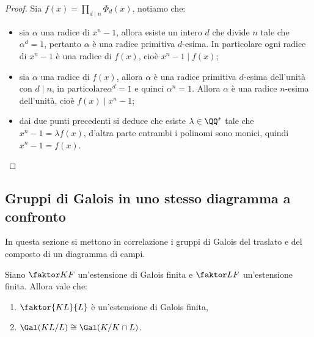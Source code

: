 \documentclass[11pt]{scrartcl}
\begin{document}
	\begin{proof}
		Sia $f(x) = \displaystyle\prod_{d \mid n}\Phi_d(x)$, notiamo che:
		\begin{itemize}
			\item sia $\alpha$ una radice di $x^n - 1$, allora esiste un intero $d$
			che divide $n$ tale che $\alpha^d = 1$, pertanto $\alpha$ è una radice primitiva
			$d$-esima. In particolare ogni radice di $x^n - 1$ è una radice di 
			$f(x)$, cioè $x^n - 1 \mid f(x)$;
			\item sia $\alpha$ una radice di $f(x)$, allora $\alpha$ è una radice
			primitiva $d$-esima dell'unità con $d\mid n$, in particolare$\alpha^d = 1$
			e quinci $\alpha^n = 1$. Allora $\alpha$ è una radice $n$-esima dell'unità,
			cioè $f(x) \mid x^n - 1$;
			\item dai due punti precedenti si deduce che esiste $\lambda \in \QQ^*$
			tale che $x^n - 1 = \lambda f(x)$, d'altra parte entrambi i polinomi
			sono monici, quindi $x^n - 1 = f(x)$.
		\end{itemize}
	\end{proof}
	
	\newpage
	
	\subsection{Gruppi di Galois in uno stesso diagramma a confronto}
	
	In questa sezione si mettono in correlazione i gruppi di Galois del traslato
	e del composto di un diagramma di campi.
	
	\begin{proposition}
		\label{prop3.13}
		Siano $\faktor K F$ un'estensione di Galois finita e $\faktor L F$ un'estensione
		finita. Allora vale che:
		\begin{enumerate}[(1)]
			\item $\faktor{KL}{L}$ è un'estensione di Galois finita,
			\item $\Gal(KL/L) \cong \Gal(K/K\cap L)$.
		\end{enumerate}
	\end{proposition}
	
\end{document}
